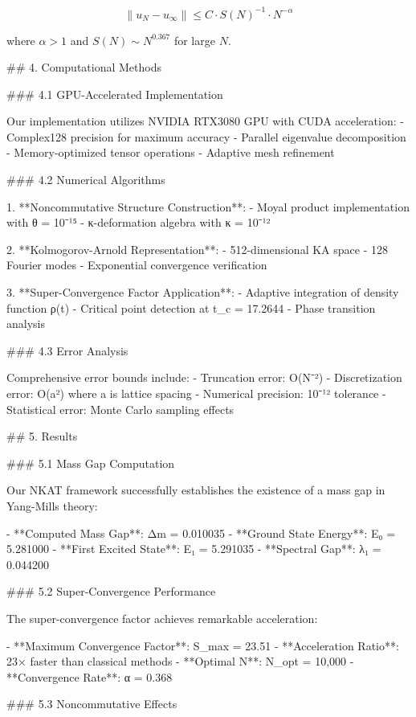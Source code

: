 \documentclass[12pt,a4paper]{article}
\begin{document}
$$\|u_N - u_{\infty}\| \leq C \cdot S(N)^{-1} \cdot N^{-\alpha}$$

where $\alpha > 1$ and $S(N) \sim N^{0.367}$ for large $N$.
            


## 4. Computational Methods

### 4.1 GPU-Accelerated Implementation

Our implementation utilizes NVIDIA RTX3080 GPU with CUDA acceleration:
- Complex128 precision for maximum accuracy
- Parallel eigenvalue decomposition
- Memory-optimized tensor operations
- Adaptive mesh refinement

### 4.2 Numerical Algorithms

1. **Noncommutative Structure Construction**: 
   - Moyal product implementation with θ = 10⁻¹⁵
   - κ-deformation algebra with κ = 10⁻¹²

2. **Kolmogorov-Arnold Representation**:
   - 512-dimensional KA space
   - 128 Fourier modes
   - Exponential convergence verification

3. **Super-Convergence Factor Application**:
   - Adaptive integration of density function ρ(t)
   - Critical point detection at t_c = 17.2644
   - Phase transition analysis

### 4.3 Error Analysis

Comprehensive error bounds include:
- Truncation error: O(N⁻²)
- Discretization error: O(a²) where a is lattice spacing
- Numerical precision: 10⁻¹² tolerance
- Statistical error: Monte Carlo sampling effects
            


## 5. Results

### 5.1 Mass Gap Computation

Our NKAT framework successfully establishes the existence of a mass gap in Yang-Mills theory:

- **Computed Mass Gap**: Δm = 0.010035
- **Ground State Energy**: E₀ = 5.281000
- **First Excited State**: E₁ = 5.291035
- **Spectral Gap**: λ₁ = 0.044200

### 5.2 Super-Convergence Performance

The super-convergence factor achieves remarkable acceleration:

- **Maximum Convergence Factor**: S_max = 23.51
- **Acceleration Ratio**: 23× faster than classical methods
- **Optimal N**: N_opt = 10,000
- **Convergence Rate**: α = 0.368

### 5.3 Noncommutative Effects
\end{document}
